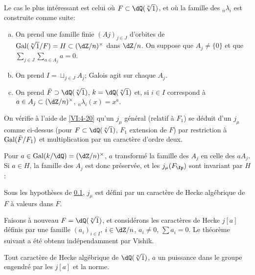 \subsection{}\label{VI:6-9}

Le cas le plus intéressant est celui où $F\subset \dQ(\sqrt[n]{1})$, et 
où la famille des $_n \lambda_i$ est construite comme suite: 
\begin{enumerate}[a)]
  \item On prend une famille finie $(Aj)_{j\in J}$ d'orbites de 
    $\gal(\sqrt[n]{1}/F)=H\subset (\dZ/n)^\times$ dans $\dZ/n$. On suppose que 
    $A_j\ne\{0\}$ et que $\sum_{j\in J} \sum_{a\in A_j} a=0$. 
  \item On prend $I=\sqcup_{j\in J} A_j$; Galois agit sur chaque $A_j$. 
  \item On prend $\bar F\supset \dQ(\sqrt[n]{1})$, $k=\dQ(\sqrt[n]{1})$ et, si 
    $i\in I$ correspond à $a\in A_j\subset (\dZ/n)^\times$, 
    $_n\lambda_i(x)=x^a$. 
\end{enumerate}

On vérifie à l'aide de \ref{VI:4-20} qu'un $j_\mu$ général (relatif à 
$F_1$) se déduit d'un $j_\mu$ comme ci-dessus (pour 
$F\subset \dQ(\sqrt[n]{1})$, $F_1$ extension de $F$) par restriction à 
$\operatorname{Gal}(\bar F/F_1)$ et multiplication par un caractère d'ordre deux. 

Pour $a\in \gal(k/\dQ)=(\dZ/n)^\times$, $a$ transformé la famille des $A_j$ 
en celle des $a A_j$. Si $a\in H$, la famille des $A_j$ est donc préservée, 
et les $j_\mu(F_\fp)$ sont invariant par $H$: 





\begin{proposition_}\label{VI:6-10}
Sous les hypothèses de \ref{VI:6-9}, $j_\mu$ est défini par un caractère 
de Hecke algébrique de $F$ à valeurs dans $F$. 
\end{proposition_}

Faisons à nouveau $F=\dQ(\sqrt[n]{1})$, et considérons les caractères de 
Hecke $j[a]$ définis par une famille $(a_i)_{i\in I}$, $i\in \dZ/n$, 
$a_i\ne 0$, $\sum a_i=0$. Le théorème suivant a été obtenu 
indépendamment par Vishik. 





\begin{theorem_}\label{VI:6-11}
Tout caractère de Hecke algébrique de $\dQ(\sqrt[n]{1})$, $a$ un puissance 
dans le groupe engendré par les $j[a]$ et la norme. 
\end{theorem_}

